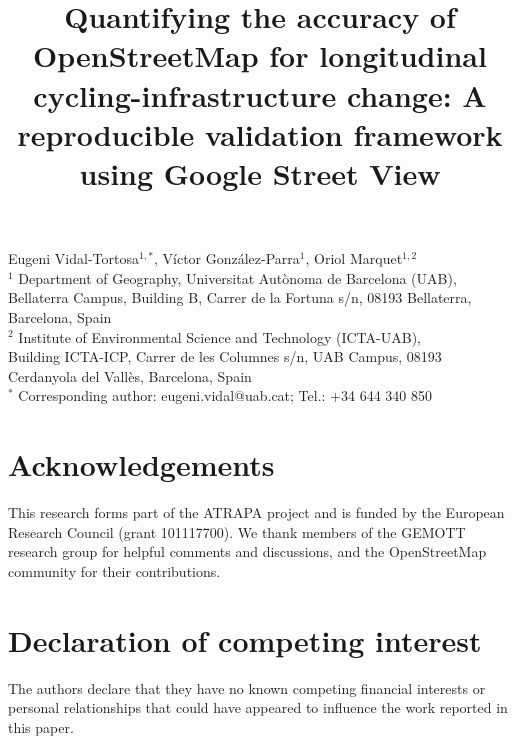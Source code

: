 \documentclass[
]{article}
\title{Quantifying the accuracy of OpenStreetMap for longitudinal
cycling-infrastructure change: A reproducible validation framework using
Google Street View}
\author{}
\date{}
\begin{document}
\maketitle


\thispagestyle{empty}
\pagestyle{empty}

\begin{center}
{\large Eugeni Vidal-Tortosa$^{1,*}$, Víctor González-Parra$^{1}$, Oriol Marquet$^{1,2}$}\\[1.0em]
{\small
$^{1}$ Department of Geography, Universitat Autònoma de Barcelona (UAB),\\
Bellaterra Campus, Building B, Carrer de la Fortuna s/n, 08193 Bellaterra, Barcelona, Spain\\[0.6em]
$^{2}$ Institute of Environmental Science and Technology (ICTA-UAB),\\
Building ICTA-ICP, Carrer de les Columnes s/n, UAB Campus, 08193 Cerdanyola del Vallès, Barcelona, Spain\\[1.0em]
$^{*}$ Corresponding author: eugeni.vidal@uab.cat; Tel.: +34 644 340 850
}
\end{center}

\section*{Acknowledgements}\label{acknowledgements}

This research forms part of the ATRAPA project and is funded by the
European Research Council (grant 101117700). We thank members of the
GEMOTT research group for helpful comments and discussions, and the
OpenStreetMap community for their contributions.

\section*{Declaration of competing
interest}\label{declaration-of-competing-interest}

The authors declare that they have no known competing financial
interests or personal relationships that could have appeared to
influence the work reported in this paper.
\end{document}
